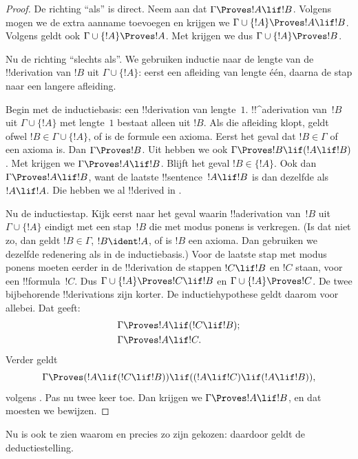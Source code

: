 \documentclass[../../../include/open-logic-section]{subfiles}
\begin{document}
\begin{proof}
De richting ``als'' is direct. Neem aan dat $\Gamma \Proves !A \lif
!B$. Volgens  mogen we de extra aanname
toevoegen en krijgen we $\Gamma \cup \{!A\} \Proves !A \lif !B$.
Volgens  geldt ook $\Gamma \cup \{!A\}
\Proves !A$. Met  krijgen we dus $\Gamma \cup \{!A\}
\Proves !B$.

Nu de richting ``slechts als''. We gebruiken inductie naar de lengte
van de !!{derivation} van $!B$ uit $\Gamma \cup \{!A\}$: eerst een
afleiding van lengte één, daarna de stap naar een langere afleiding.

Begin met de inductiebasis: een !!{derivation} van lengte~$1$.
!!^a{derivation} van~$!B$ uit $\Gamma \cup \{!A\}$ met lengte~$1$
bestaat alleen uit $!B$. Als die afleiding klopt, geldt ofwel
$!B$$\in \Gamma \cup \{!A\}$, of is de formule een axioma. Eerst het
geval dat $!B \in \Gamma$ of een axioma is. Dan $\Gamma \Proves !B$.
Uit  hebben we ook $\Gamma \Proves !B \lif (!A
\lif !B)$. Met  krijgen we $\Gamma \Proves !A \lif !B$.
Blijft het geval $!B \in \{ !A\}$. Ook dan $\Gamma \Proves !A \lif
!B$, want de laatste !!{sentence}~$!A \lif !B$ is dan dezelfde als
$!A \lif !A$. Die hebben we al !!{derive}d in
.

Nu de inductiestap. Kijk eerst naar het geval waarin !!a{derivation}
van~$!B$ uit $\Gamma \cup \{!A\}$ eindigt met een stap~$!B$ die met
modus ponens is verkregen. (Is dat niet zo, dan geldt $!B \in \Gamma$,
$!B \ident !A$, of is $!B$ een axioma. Dan gebruiken we dezelfde
redenering als in de inductiebasis.) Voor de laatste stap met modus
ponens moeten eerder in de !!{derivation} de stappen $!C \lif !B$ en
$!C$ staan, voor een !!{formula}~$!C$. Dus $\Gamma \cup \{!A\}
\Proves !C \lif !B$ en $\Gamma \cup \{!A\} \Proves !C$. De twee
bijbehorende !!{derivation}s zijn korter. De inductiehypothese geldt
daarom voor allebei. Dat geeft:
\begin{align*}
  & \Gamma \Proves !A \lif (!C \lif !B); \\
  & \Gamma \Proves !A \lif !C.
\end{align*}
Verder geldt
\[
\Gamma \Proves (!A \lif (!C \lif !B)) \lif
((!A\lif !C)  \lif (!A \lif !B)),
\]
volgens . Pas  nu twee keer toe. Dan
krijgen we $\Gamma \Proves !A \lif !B$, en dat moesten we bewijzen.
\end{proof}

Nu is ook te zien waarom  en
 precies zo zijn gekozen: daardoor geldt de
deductiestelling.
\end{document}
